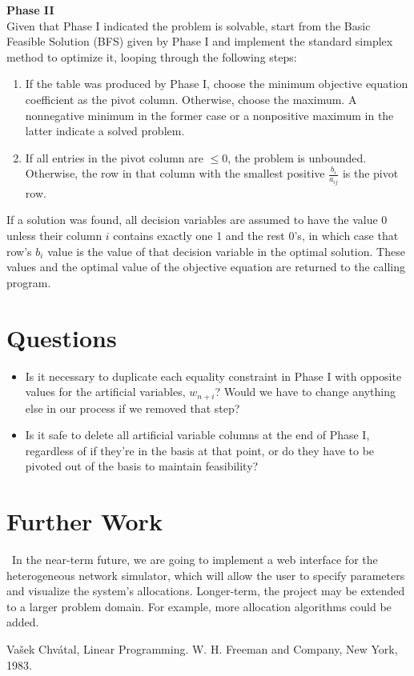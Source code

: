 \documentclass[11pt]{article}
\begin{document}
\noindent \textbf{Phase II}\\
Given that Phase I indicated the problem is solvable, start from the Basic Feasible Solution (BFS) given by Phase I and implement the standard simplex method to optimize it, looping through the following steps:
\begin{enumerate}
\item If the table was produced by Phase I, choose the minimum objective equation coefficient as the pivot column. Otherwise, choose the maximum. A nonnegative minimum in the former case or a nonpositive maximum in the latter indicate a solved problem.
\item If all entries in the pivot column are $\leq 0$, the problem is unbounded. Otherwise, the row in that column with the smallest positive $\frac{b_i}{a_{ij}}$ is the pivot row.
\end{enumerate}
If a solution was found, all decision variables are assumed to have the value 0 unless their column $i$ contains exactly one 1 and the rest 0's, in which case that row's $b_i$ value is the value of that decision variable in the optimal solution. These values and the optimal value of the objective equation are returned to the calling program.

\section{Questions}

\begin{itemize}
\item Is it necessary to duplicate each equality constraint in Phase I with opposite values for the artificial variables, $w_{n+i}$? Would we have to change anything else in our process if we removed that step?
\item Is it safe to delete all artificial variable columns at the end of Phase I, regardless of if they're in the basis at that point, or do they have to be pivoted out of the basis to maintain feasibility?
\end{itemize}

\section{Further Work}

~\indent In the near-term future, we are going to implement a web interface for the heterogeneous network simulator, which will allow the user to specify parameters and visualize the system's allocations. Longer-term, the project may be extended to a larger problem domain. For example, more allocation algorithms could be added.

\begin{thebibliography}{1}
  Vašek Chvátal,
  Linear Programming.
  W. H. Freeman and Company, New York,
  1983.
\end{thebibliography}  
       
\end{document}
